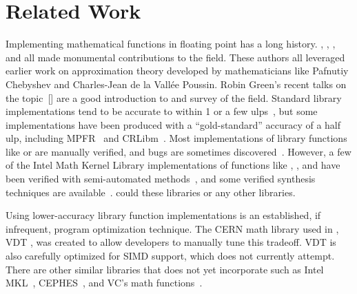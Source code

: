 \documentclass[paper.tex]{subfiles}
\begin{document}
\section{Related Work}
\label{sec:relwork}






Implementing mathematical functions in floating point has a long history.
\citet{kahan, kahan-log}, \citet{higham},
  \citet{muller}, and \citet{cody-waite}
  all made monumental contributions to the field.
These authors all leveraged earlier work on approximation theory
  developed by mathematicians like Pafnutiy Chebyshev
  and Charles-Jean de la Vall\'ee Poussin.
Robin Green's recent talks on the topic~[\citeyear{faster-math-functions,even-faster-math-functions}]
  are a good introduction to and survey of the field.
Standard library implementations tend to be accurate
  to within 1 or a few ulps~\cite{glibc-accuracy},
  but some implementations have been produced
  with a ``gold-standard'' accuracy of  a half ulp,
  including MPFR~\cite{mpfr} and CRLibm~\cite{crlibm}.
Most implementations of library functions like  or 
  are manually verified, and bugs are sometimes discovered~\cite{intel-sin,faster-math-functions}.
However, a few of the Intel Math Kernel Library implementations
  of functions like , , and  have been verified
  with semi-automated methods~\cite{verified-math-h},
  and some verified synthesis techniques are available~\cite{jay-p-lim}.
\name could these libraries or any other libraries.

Using lower-accuracy library function implementations
  is an established, if infrequent, program optimization technique.
The CERN math library
  used in \name, VDT \cite{cern},
   was created to allow developers to manually tune this tradeoff.
VDT is also carefully optimized for SIMD support,
  which \name does not currently attempt.
There are other similar libraries that \name does not yet incorporate
  such as
  Intel MKL~\cite{mkl}, CEPHES~\cite{cephes},
  and VC's math functions~\cite{vc}.
\end{document}
